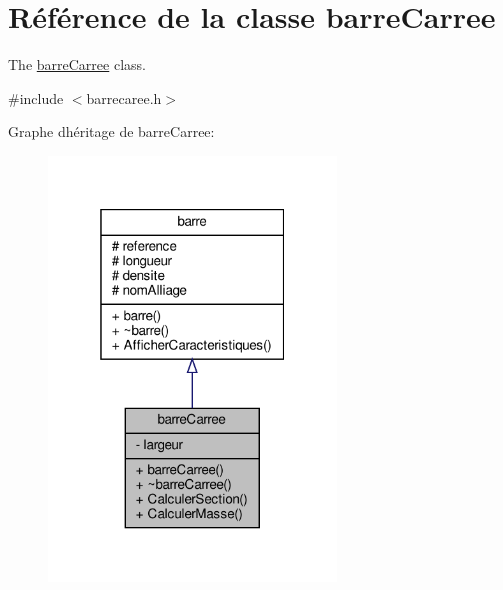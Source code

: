 \hypertarget{classbarre_carree}{}\section{Référence de la classe barre\+Carree}
\label{classbarre_carree}


The \hyperlink{classbarre_carree}{barre\+Carree} class.  




{\ttfamily \#include $<$barrecaree.\+h$>$}



Graphe d\textquotesingle{}héritage de barre\+Carree\+:
\nopagebreak
\begin{figure}[H]
\begin{center}
\leavevmode
\includegraphics[width=217pt]{classbarre_carree__inherit__graph}
\end{center}
\end{figure}


